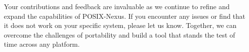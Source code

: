 Your contributions and feedback are invaluable as we continue to refine and expand the capabilities of POSIX-Nexus. If you encounter any issues or find that it does not work on your specific system, please let us know. Together, we can overcome the challenges of portability and build a tool that stands the test of time across any platform.
\\
